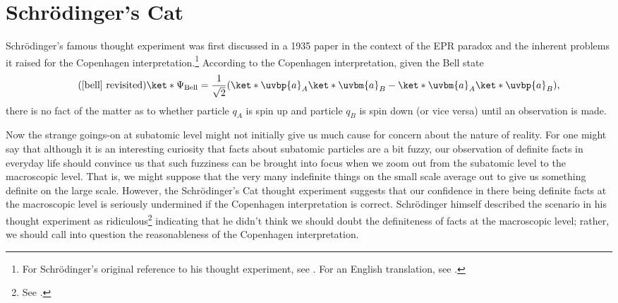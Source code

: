 \documentclass[12pt]{report}
\begin{document}


\section{Schr\"{o}dinger's Cat\label{SchrondingersCat}}
Schr\"{o}dinger's famous thought experiment was first discussed in a 1935 paper in the context of the EPR paradox and the inherent problems it raised for the Copenhagen interpretation.\footnote{For Schr\"{o}dinger's original reference to his thought experiment, see \cite{SchrondingerOrig}. For an English translation, see \cite{SchrondingerEnglish}.} According to the Copenhagen interpretation, given the Bell state 
\begin{equation}\tag{\ref{bell} revisited}
    \ket*{\Psi_{\text{Bell}}}=\frac{1}{\sqrt{2}}(\ket*{\uvbp{a}}_A\ket*{\uvbm{a}}_B-\ket*{\uvbm{a}}_A\ket*{\uvbp{a}}_B),
\end{equation}
there is no fact of the matter as to whether particle $q_A$ is spin up and particle $q_B$ is spin down (or vice versa) until an observation is made.  

Now the strange goings-on at subatomic level might not initially give us much cause for concern about the nature of reality. For one might say that although it is an interesting curiosity that facts about subatomic particles are a bit fuzzy, our observation of definite facts in everyday life should convince us that such fuzziness can be brought into focus when we zoom out from the subatomic level to the macroscopic level. That is, we might suppose that the very many indefinite things on the small scale average out to give us something definite on the large scale. However, the Schr\"{o}dinger's Cat thought experiment suggests that our confidence in there being definite facts at the macroscopic level is seriously undermined if the Copenhagen interpretation is correct. Schr\"{o}dinger himself described the scenario in his thought experiment as ridiculous\footnote{See \cite[p. 328]{SchrondingerEnglish}.} indicating that he didn't think we should doubt the definiteness of facts at the macroscopic level; rather, we should call into question the reasonableness of the Copenhagen interpretation. 
\end{document}
